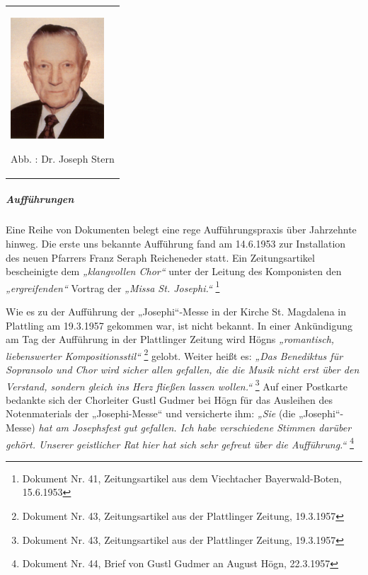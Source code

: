\documentclass[a4paper]{article}
\newcommand\zitat[1]{\textit{#1}}
\newcounter{Abb}
\renewcommand\theAbb{\arabic{Abb}}
\begin{document}
\begin{center}
\begin{minipage}{3.884cm}
\begin{flushleft}
\tablefirsthead{}
\tablehead{}
\tabletail{}
\tablelasttail{}
\begin{supertabular}{m{3.684cm}}

\includegraphics[width=3.501cm,height=4.533cm]{pictures/zulassungsarbeit-img106.jpg}

Abb. \stepcounter{Abb}{\theAbb}: Dr. Joseph Stern\\
\end{supertabular}
\end{flushleft}
\end{minipage}
\end{center}
\subparagraph{Aufführungen}
Eine Reihe von Dokumenten belegt eine rege Aufführungspraxis über
Jahrzehnte hinweg. Die erste uns bekannte Aufführung fand am 14.6.1953
zur Installation des neuen Pfarrers Franz Seraph Reicheneder statt. Ein
Zeitungsartikel bescheinigte dem \zitat{„klangvollen Chor“}
unter der Leitung des Komponisten den \zitat{„ergreifenden“}
Vortrag der \zitat{„Missa St. Josephi.“ } \footnote{Dokument
Nr. 41, Zeitungsartikel aus dem Viechtacher Bayerwald-Boten, 15.6.1953}

Wie es zu der Aufführung der „Josephi“-Messe in der Kirche St. Magdalena
in Plattling am 19.3.1957 gekommen war, ist nicht bekannt. In einer
Ankündigung am Tag der Aufführung in der Plattlinger Zeitung wird Högns
\zitat{„romantisch, liebenswerter Kompositionsstil“
} \footnote{Dokument Nr. 43, Zeitungsartikel aus der Plattlinger
Zeitung, 19.3.1957} gelobt. Weiter heißt es: \zitat{„Das
Benediktus für Sopransolo und Chor wird sicher allen gefallen, die die
Musik nicht erst über den Verstand, sondern gleich ins Herz fließen
lassen wollen.“ } \footnote{Dokument Nr. 43, Zeitungsartikel aus der
Plattlinger Zeitung, 19.3.1957} Auf einer Postkarte bedankte sich der
Chorleiter Gustl Gudmer bei Högn für das Ausleihen des Notenmaterials
der „Josephi-Messe“ und versicherte ihm: \zitat{„Sie }(die
„Josephi“-Messe)\zitat{ hat am Josephsfest gut gefallen. Ich
habe verschiedene Stimmen darüber gehört. Unserer geistlicher Rat hier
hat sich sehr gefreut über die Aufführung.“ } \footnote{Dokument Nr.
44, Brief von Gustl Gudmer an August Högn, 22.3.1957}
\end{document}
